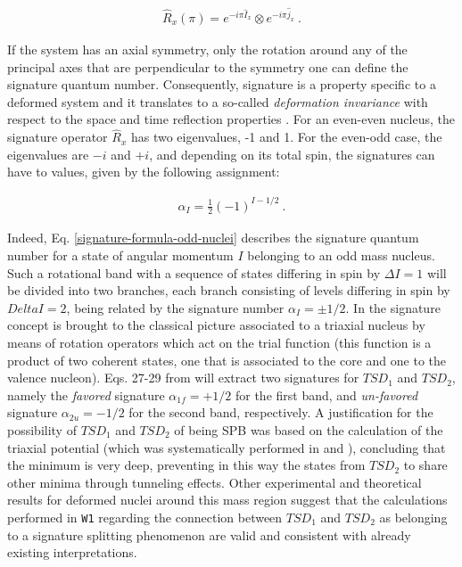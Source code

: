\documentclass[11pt]{article}
\begin{document}
\begin{align}
    \hat{R}_x(\pi)=e^{-i\pi\hat{I}_x}\otimes e^{-i\pi\hat{j}_x}\ .
\end{align}

If the system has an axial symmetry, only the rotation around any of the principal axes that are perpendicular to the symmetry one can define the signature quantum number. Consequently, signature is a property specific to a deformed system and it translates to a so-called \emph{deformation invariance} with respect to the space and time reflection properties \cite{bohr1998nuclear}. For an even-even nucleus, the signature operator $\hat{R}_x$ has two eigenvalues, -1 and 1. For the even-odd case, the eigenvalues are $-i$ and $+i$, and depending on its total spin, the signatures can have to values, given by the following assignment:

\begin{align}
    \alpha_I=\frac{1}{2}\left(-1\right)^{I-1/2}\ .
    \label{signature-formula-odd-nuclei}
\end{align}

Indeed, Eq. \ref{signature-formula-odd-nuclei} describes the signature quantum number for a state of angular momentum $I$ belonging to an odd mass nucleus. Such a rotational band with a sequence of states differing in spin by $\Delta I=1$ will be divided into two branches, each branch consisting of levels differing in spin by $Delta I=2$, being related by the signature number $\alpha_I=\pm 1/2$. In \cite{raduta2020approach} the signature concept is brought to the classical picture associated to a triaxial nucleus by means of rotation operators which act on the trial function (this function is a product of two coherent states, one that is associated to the core and one to the valence nucleon). Eqs. 27-29 from \cite{raduta2020approach} will extract two signatures for $TSD_1$ and $TSD_2$, namely the \emph{favored} signature $\alpha_{1f}=+1/2$ for the first band, and \emph{un-favored} signature $\alpha_{2u}=-1/2$ for the second band, respectively. A justification for the possibility of $TSD_1$ and $TSD_2$ of being SPB was based on the calculation of the triaxial potential (which was systematically performed in \cite{raduta2017semiclassical} and \cite{raduta2018wobbling}), concluding that the minimum is very deep, preventing in this way the states from $TSD_2$ to share other minima through tunneling effects. Other experimental and theoretical results \cite{sun1994varied,khalaf11properties,uma2015deltai,mittal2016signature} for deformed nuclei around this mass region suggest that the calculations performed in \texttt{W1} regarding the connection between $TSD_1$ and $TSD_2$ as belonging to a signature splitting phenomenon are valid and consistent with already existing interpretations.
\end{document}
